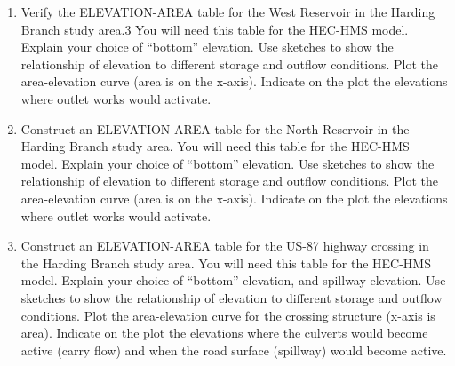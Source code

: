 \documentclass[12pt]{article}
\begin{document}
\begin{enumerate}

\item Verify the ELEVATION-AREA table for the West Reservoir in the Harding Branch study area.3 You will need this table for the HEC-HMS model. Explain your choice of “bottom” elevation. Use sketches to show the relationship of elevation to different storage and outflow conditions. Plot the area-elevation curve (area is on the x-axis). Indicate on the plot the elevations where outlet works would activate.

\item Construct an ELEVATION-AREA table for the North Reservoir in the Harding Branch study area. You will need this table for the HEC-HMS model. Explain your choice of “bottom” elevation. Use sketches to show the relationship of elevation to different storage and outflow conditions. Plot the area-elevation curve (area is on the x-axis). Indicate on the plot the elevations where outlet works would activate.

\item Construct an ELEVATION-AREA table for the US-87 highway crossing in the Harding Branch study area. You will need this table for the HEC-HMS model. Explain your choice of “bottom” elevation, and spillway elevation. Use sketches to show the relationship of elevation to different storage and outflow conditions. Plot the area-elevation curve for the crossing structure (x-axis is area). Indicate on the plot the elevations where the culverts would become active (carry flow) and when the road surface (spillway) would become active.

\end{enumerate}
\end{document}
